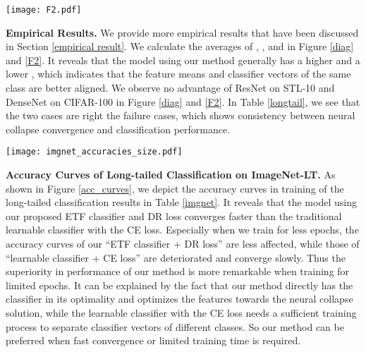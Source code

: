 \documentclass{article}
\newcommand{\<}{\left\langle}
\renewcommand{\>}{\right\rangle}
\begin{document}
\begin{center}
{\begin{figure*}[!t]
\begin{center}
\texttt{[image: F2.pdf]}
		\vspace{-5mm}
		\caption{Statistics of  during training, where , , and , using ResNet (up) and DenseNet (bottom) on four datasets. The models are trained on CIFAR-100 with an imbalance ratio of 0.02}
		\label{F2}
	\end{center}
	\vspace{-1mm}
\end{figure*}



\textbf{Empirical Results.} We provide more empirical results that have been discussed in Section \ref{empirical result}. 
We calculate the averages of , , and  in Figure \ref{diag} and \ref{F2}. It reveals that the model using our method generally has a higher  and a lower , which indicates that the feature means and classifier vectors of the same class are better aligned. We observe no advantage of ResNet on STL-10 and DenseNet on CIFAR-100 in Figure \ref{diag} and \ref{F2}. In Table \ref{longtail}, we see that the two cases are right the failure cases, which shows consistency between neural collapse convergence and classification performance.












\begin{figure*}[!t]
	\begin{center}
		\texttt{[image: imgnet\_accuracies\_size.pdf]}
		\vspace{-5mm}
		\caption{Top-1 accuracy curves on ImageNet-LT using the ResNet-50 backbone with ``learnable classifier + CE loss'' and our proposed ``ETF classifier + DR loss'' for (a) 90, (b) 120, (c) 150, and (d) 180 epochs of training.}
		\label{acc_curves}
	\end{center}
\end{figure*}


\textbf{Accuracy Curves of Long-tailed Classification on ImageNet-LT.} As shown in Figure \ref{acc_curves}, we depict the accuracy curves in training of the long-tailed classification results in Table \ref{imgnet}. It reveals that the model using our proposed ETF classifier and DR loss converges faster than the traditional learnable classifier with the CE loss. Especially when we train for less epochs, the accuracy curves of our ``ETF classifier + DR loss'' are less affected, while those of ``learnable classifier + CE loss'' are deteriorated and converge slowly. Thus the superiority in performance of our method is more remarkable when training for limited epochs. It can be explained by the fact that our method directly has the classifier in its optimality and optimizes the features towards the neural collapse solution, while the learnable classifier with the CE loss needs a sufficient training process to separate classifier vectors of different classes. So our method can be preferred when fast convergence or limited training time is required.

}
\end{center}
\end{document}
